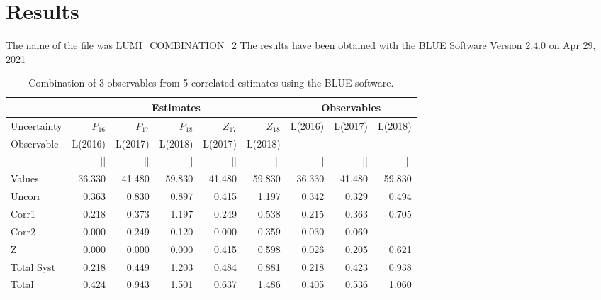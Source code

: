 \documentclass[11pt,a4paper]{article}
\begin{document}
 \section{Results} 
 \label{sec:result} 
 The name of the file was LUMI_COMBINATION_2 
 The results have been obtained with the BLUE Software Version 2.4.0 
 on Apr 29, 2021 
 \par 
%
%
\begin{sidewaystable}[tbp!]
\begin{center}
\begin{tabular}{|l|r|r|r|r|r||r|r|r|}
\cline{2- 9}
  \multicolumn{1}{c}{} 
& \multicolumn{ 5}{|c||}{Estimates} 
& \multicolumn{ 3}{|c|}{Observables} \\ 
\hline
Uncertainty & $   P_16$ & $   P_17$ & $   P_18$ & $   Z_17$ & $   Z_18$ & L(2016) & L(2017) & L(2018) \\ 
Observable & L(2016) & L(2017) & L(2018) & L(2017) & L(2018) &   &   &   \\ 
 & [] & [] & [] & [] & [] & [] & [] & [] \\ 
\hline
Values  & 36.330 & 41.480 & 59.830 & 41.480 & 59.830 & 36.330 & 41.480 & 59.830 \\ 
 Uncorr & 0.363 & 0.830 & 0.897 & 0.415 & 1.197 & 0.342 & 0.329 & 0.494 \\ 
  Corr1 & 0.218 & 0.373 & 1.197 & 0.249 & 0.538 & 0.215 & 0.363 & 0.705 \\ 
  Corr2 & 0.000 & 0.249 & 0.120 & 0.000 & 0.359 & 0.030 & 0.069 & \color{red}{-0.057} \\ 
      Z & 0.000 & 0.000 & 0.000 & 0.415 & 0.598 & 0.026 & 0.205 & 0.621 \\ 
\hline
Total Syst & 0.218 & 0.449 & 1.203 & 0.484 & 0.881 & 0.218 & 0.423 & 0.938 \\ 
Total    & 0.424 & 0.943 & 1.501 & 0.637 & 1.486 & 0.405 & 0.536 & 1.060 \\ 
\hline
\end{tabular}
\end{center}
\caption{Combination of  3 observables from  5 correlated estimates using the BLUE software.}
\label{tab:BlueRes}
\end{sidewaystable}
%
%
\end{document}
